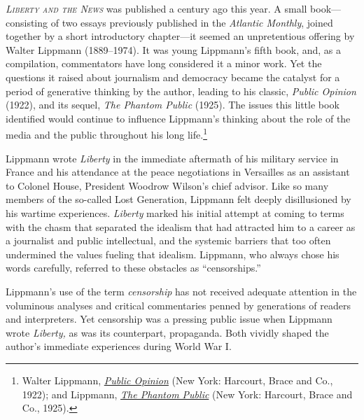 \documentclass[openany,nobib,nohyper]{tufte-book}
\begin{document}
\emph{}

\vspace{0.5in}

\noindent \textsc{\emph{Liberty and the News}} was published a century ago this year. A
small book---consisting of two essays previously published in the
\emph{Atlantic Monthly}, joined together by a short introductory
chapter---it seemed an unpretentious offering by Walter Lippmann
(1889--1974). It was young Lippmann's fifth book, and, as a compilation,
commentators have long considered it a minor work. Yet the questions it
raised about journalism and democracy became the catalyst for a period
of generative thinking by the author, leading to his classic,
\emph{Public Opinion} (1922), and its sequel, \emph{The Phantom Public}
(1925). The issues this little book identified would continue to
influence Lippmann's thinking about the role of the media and the public
throughout his long life.\footnote{Walter Lippmann,
  \emph{\href{http://www.worldcat.org/oclc/812629160}{Public Opinion}}
  (New York: Harcourt, Brace and Co., 1922); and Lippmann,
  \emph{\href{http://www.worldcat.org/oclc/550725}{The Phantom Public}}
  (New York: Harcourt, Brace and Co., 1925).}

Lippmann wrote \emph{Liberty} in the immediate aftermath of his military
service in France and his attendance at the peace negotiations in
Versailles as an assistant to Colonel House, President Woodrow Wilson's
chief advisor. Like so many members of the so-called Lost Generation,
Lippmann felt deeply disillusioned by his wartime experiences.
\emph{Liberty} marked his initial attempt at coming to terms with the
chasm that separated the idealism that had attracted him to a career as
a journalist and public intellectual, and the systemic barriers that too
often undermined the values fueling that idealism. Lippmann, who always
chose his words carefully, referred to these obstacles as
``censorships.''

Lippmann's use of the term \emph{censorship} has not received adequate
attention in the voluminous analyses and critical commentaries penned by
generations of readers and interpreters. Yet censorship was a pressing
public issue when Lippmann wrote \emph{Liberty,} as was its counterpart,
propaganda. Both vividly shaped the author's immediate experiences
during World War I.
\end{document}
